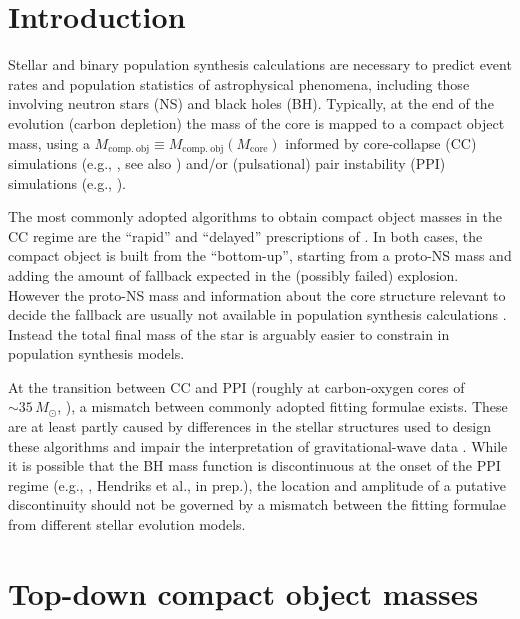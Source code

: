 \documentclass[twocolumn]{aastex63}
\begin{document}
\section{Introduction}

Stellar and binary population synthesis calculations are necessary to
predict event rates and population statistics of astrophysical
phenomena, including those involving neutron stars (NS) and
black holes (BH). Typically, at the end of the evolution (carbon
depletion) the mass of the core is mapped to a compact object mass, using a
$M_\mathrm{comp.\ obj}\equiv M_\mathrm{comp.\ obj}(M_\mathrm{core})$
informed by core-collapse (CC) simulations (e.g., \citealt{fryer:12,
  spera:15, mandel:20, couch:20}, see also \citealt{zapartas:21,
  patton:21}) and/or (pulsational) pair instability (PPI) simulations
(e.g., \citealt{belczynski:16, woosley:17, spera:17, stevenson:19,
  marchant:19, farmer:19, breivik:20, renzo:20csm, costa:21}).

The most commonly adopted algorithms to obtain compact object masses
in the CC regime are the ``rapid'' and ``delayed''
prescriptions of \cite{fryer:12}. In both cases, the compact object
is built from the ``bottom-up'', starting from a proto-NS mass and adding the amount of
fallback expected in the (possibly failed) explosion. However the
proto-NS mass and information about the core structure relevant
to decide the fallback are usually not available in population
synthesis calculations \citep[e.g.,][]{patton:20}. Instead the total final mass of
the star is arguably easier to constrain in population synthesis models.

At the transition between CC and PPI (roughly at carbon-oxygen cores
of $\sim{}35\,M_\odot$, \citealt{woosley:17, marchant:19, farmer:19, renzo:20csm,
  costa:21}), a mismatch between commonly adopted fitting formulae
exists. These are at least partly caused by differences in the stellar structures used to
design these algorithms and impair the
interpretation of gravitational-wave data \citep[as pointed out in
Fig.~5 of][]{vanson:21}. While it is possible that the BH mass
function is discontinuous at the onset of the PPI regime (e.g.,
\citealt{renzo:20conv,costa:21}, Hendriks et al., in prep.), the
location and amplitude of a putative discontinuity should not be
governed by a mismatch between the fitting formulae from different stellar
evolution models.

\vspace*{-20pt}
\section{Top-down compact object masses}
\end{document}
